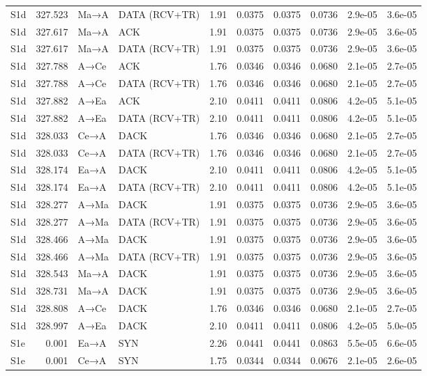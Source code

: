 \documentclass[10pt,letterpaper]{article}
\begin{document}
{\begin{longtable}{@{}lrllrrrrrr@{}}
S1d & 327.523 & Ma→A & DATA (RCV+TR) & 1.91 & 0.0375 & 0.0375 & 0.0736 & 2.9e-05 & 3.6e-05 \\
S1d & 327.617 & Ma→A & ACK & 1.91 & 0.0375 & 0.0375 & 0.0736 & 2.9e-05 & 3.6e-05 \\
S1d & 327.617 & Ma→A & DATA (RCV+TR) & 1.91 & 0.0375 & 0.0375 & 0.0736 & 2.9e-05 & 3.6e-05 \\
S1d & 327.788 & A→Ce & ACK & 1.76 & 0.0346 & 0.0346 & 0.0680 & 2.1e-05 & 2.7e-05 \\
S1d & 327.788 & A→Ce & DATA (RCV+TR) & 1.76 & 0.0346 & 0.0346 & 0.0680 & 2.1e-05 & 2.7e-05 \\
S1d & 327.882 & A→Ea & ACK & 2.10 & 0.0411 & 0.0411 & 0.0806 & 4.2e-05 & 5.1e-05 \\
S1d & 327.882 & A→Ea & DATA (RCV+TR) & 2.10 & 0.0411 & 0.0411 & 0.0806 & 4.2e-05 & 5.1e-05 \\
S1d & 328.033 & Ce→A & DACK & 1.76 & 0.0346 & 0.0346 & 0.0680 & 2.1e-05 & 2.7e-05 \\
S1d & 328.033 & Ce→A & DATA (RCV+TR) & 1.76 & 0.0346 & 0.0346 & 0.0680 & 2.1e-05 & 2.7e-05 \\
S1d & 328.174 & Ea→A & DACK & 2.10 & 0.0411 & 0.0411 & 0.0806 & 4.2e-05 & 5.1e-05 \\
S1d & 328.174 & Ea→A & DATA (RCV+TR) & 2.10 & 0.0411 & 0.0411 & 0.0806 & 4.2e-05 & 5.1e-05 \\
S1d & 328.277 & A→Ma & DACK & 1.91 & 0.0375 & 0.0375 & 0.0736 & 2.9e-05 & 3.6e-05 \\
S1d & 328.277 & A→Ma & DATA (RCV+TR) & 1.91 & 0.0375 & 0.0375 & 0.0736 & 2.9e-05 & 3.6e-05 \\
S1d & 328.466 & A→Ma & DACK & 1.91 & 0.0375 & 0.0375 & 0.0736 & 2.9e-05 & 3.6e-05 \\
S1d & 328.466 & A→Ma & DATA (RCV+TR) & 1.91 & 0.0375 & 0.0375 & 0.0736 & 2.9e-05 & 3.6e-05 \\
S1d & 328.543 & Ma→A & DACK & 1.91 & 0.0375 & 0.0375 & 0.0736 & 2.9e-05 & 3.6e-05 \\
S1d & 328.731 & Ma→A & DACK & 1.91 & 0.0375 & 0.0375 & 0.0736 & 2.9e-05 & 3.6e-05 \\
S1d & 328.808 & A→Ce & DACK & 1.76 & 0.0346 & 0.0346 & 0.0680 & 2.1e-05 & 2.7e-05 \\
S1d & 328.997 & A→Ea & DACK & 2.10 & 0.0411 & 0.0411 & 0.0806 & 4.2e-05 & 5.0e-05 \\
S1e & 0.001 & Ea→A & SYN & 2.26 & 0.0441 & 0.0441 & 0.0863 & 5.5e-05 & 6.6e-05 \\
S1e & 0.001 & Ce→A & SYN & 1.75 & 0.0344 & 0.0344 & 0.0676 & 2.1e-05 & 2.6e-05 \\

\end{longtable}}
\end{document}
